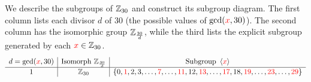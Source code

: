 \begin{example}{}{}
We describe the subgroups of $\mathbb{Z}_{30}$ and construct its subgroup diagram. The first column lists each divisor $d$ of $30$ (the possible values of $\gcd(\textcolor{red}{x},30)$). The second column has the isomorphic group $\mathbb{Z}_{\frac{30}d}$, while the third lists the explicit subgroup generated by each $\textcolor{red}{x}\in\mathbb{Z}_{30}$.
  \[
  	\def\arraystretch{1.05}
  	\begin{array}[t]{c|c|c}
			d=\gcd(\textcolor{red}{x},30) & \text{Isomorph }\Z_{\frac{30}d} & \text{Subgroup } \ip{\textcolor{red}{x}} \\\hline
			1 & \Z_{30} & \{0,\textcolor{red}{1},2,3,\ldots,\textcolor{red}{7},\ldots,\textcolor{red}{11},12,\textcolor{red}{13},\ldots,\textcolor{red}{17},18,\textcolor{red}{19},\ldots,\textcolor{red}{23},\ldots,\textcolor{red}{29}\}\\

\end{array}\]
\end{example}
